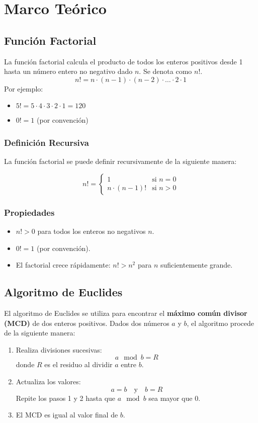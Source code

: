 \documentclass[conference]{IEEEtran}
\begin{document}
\section{Marco Te\'orico}


	\subsection{Función Factorial}
		La función factorial calcula el producto de todos los enteros positivos 
		desde 1 hasta un número entero no negativo dado \(n\). Se denota como \(n!\).
		\[ n! = n \cdot (n-1) \cdot (n-2) \cdot \ldots \cdot 2 \cdot 1 \]
		Por ejemplo:
		\begin{itemize}
			\item \(5! = 5 \cdot 4 \cdot 3 \cdot 2 \cdot 1 = 120\)
			\item \(0! = 1\) (por convención)
		\end{itemize}
		\subsubsection{Definición Recursiva}

			La función factorial se puede definir recursivamente de la siguiente manera:

			\[ n! = \begin{cases}
				1 & \text{si } n = 0 \\
				n \cdot (n-1)! & \text{si } n > 0
			\end{cases} \]
		\subsubsection{Propiedades}

		\begin{itemize}
				\item \(n! > 0\) para todos los enteros no negativos \(n\).
				\item \(0! = 1\) (por convención).
				\item El factorial crece rápidamente: \(n! > n^2\) para \(n\) suficientemente grande.
			\end{itemize}
	\subsection{Algoritmo de Euclides}
		El algoritmo de Euclides se utiliza para encontrar el 
		\textbf{máximo común divisor (MCD)} de dos enteros positivos.
		Dados dos números \(a\) y \(b\), el algoritmo procede de la siguiente manera:
		\begin{enumerate}
			\item Realiza divisiones sucesivas:
				\[ a \mod b = R \]
				donde \(R\) es el residuo al dividir \(a\) entre \(b\).
			\item Actualiza los valores:
				\[ a = b \quad \text{y} \quad b = R \]
				Repite los pasos 1 y 2 hasta que \(a \mod b\) sea mayor que 0.
			\item El MCD es igual al valor final de \(b\).
		\end{enumerate}
\end{document}
